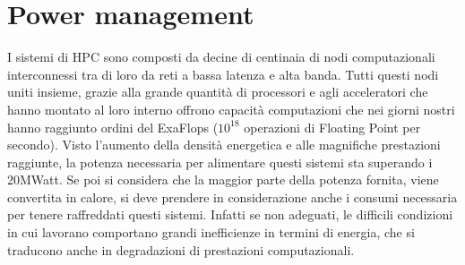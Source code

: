 \chapter{Power management}

I sistemi di HPC sono composti da decine di centinaia di nodi computazionali interconnessi tra di loro da reti a bassa latenza e alta banda. 
Tutti questi nodi uniti insieme, grazie alla grande quantità di processori e agli acceleratori che hanno montato al loro interno offrono capacità computazioni che nei giorni nostri hanno raggiunto ordini del ExaFlops ($10^{18}$ operazioni di  Floating Point per secondo).
Visto l'aumento della densità energetica e alle magnifiche prestazioni raggiunte, la potenza necessaria per alimentare questi sistemi sta superando i 20MWatt. Se poi si considera che la maggior parte della potenza fornita, viene convertita in calore, si deve prendere in considerazione anche i consumi necessaria per tenere raffreddati questi sistemi. Infatti se non adeguati, le difficili condizioni in cui lavorano comportano grandi inefficienze in termini di energia, che si traducono anche in degradazioni di prestazioni computazionali. 
